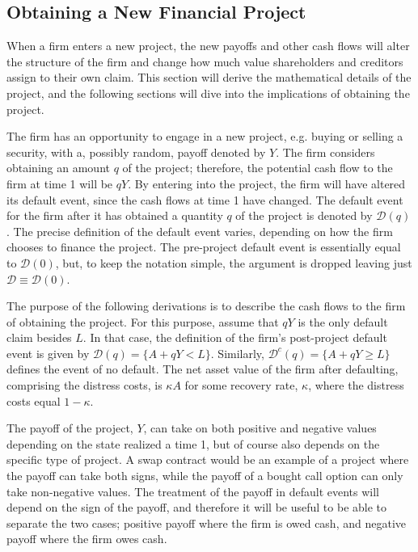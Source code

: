 \documentclass[main.tex]{subfiles}
\begin{document}
    \subsection{Obtaining a New Financial Project}
        When a firm enters a new project, the new payoffs and other cash flows
        will alter the structure of the firm and
        change how much value shareholders and creditors assign to their own claim.
        This section will derive the mathematical details of the project,
        and the following sections will dive into the implications of obtaining the project.

        The firm has an opportunity to engage in a new project, e.g. buying or selling a security,
        with a, possibly random, payoff denoted by $Y$.
        The firm considers obtaining an amount $q$ of the project;
        therefore, the potential cash flow to the firm at time 1 will be $qY$.
        By entering into the project, the firm will have altered its default event,
        since the cash flows at time 1 have changed.
        The default event for the firm after it has obtained a quantity $q$ of the project
        is denoted by $\mathcal{D}(q)$.
        The precise definition of the default event varies, 
        depending on how the firm chooses to finance the project.
        The pre-project default event is essentially equal to $\mathcal{D}(0)$,
        but, to keep the notation simple, the argument is dropped leaving just 
        $\mathcal{D}\equiv\mathcal{D}(0)$.

        The purpose of the following derivations is to describe the cash flows
        to the firm of obtaining the project.
        For this purpose, assume that $qY$ is the only default claim besides $L$. 
        In that case, the definition of the firm's post-project default event is given by 
        $\mathcal{D}(q) = \{A + qY < L\}$.
        Similarly, $\mathcal{D}^{c}(q) = \{A + qY \geq L\}$ defines the event of no default.
        The net asset value of the firm after defaulting, comprising the distress costs, is $\kappa A$ for some recovery rate, $\kappa$, where the distress costs equal $1-\kappa$.

        The payoff of the project, $Y$, can take on both positive and negative values
        depending on the state realized a time 1, 
        but of course also depends on the specific type of project. 
        A swap contract would be an example of a project where the payoff can take both signs,
        while the payoff of a bought call option can only take non-negative values.
        The treatment of the payoff in default events will depend on the sign of the payoff,
        and therefore it will be useful to be able to separate the two cases;
        positive payoff where the firm is owed cash,
        and negative payoff where the firm owes cash.
\end{document}
